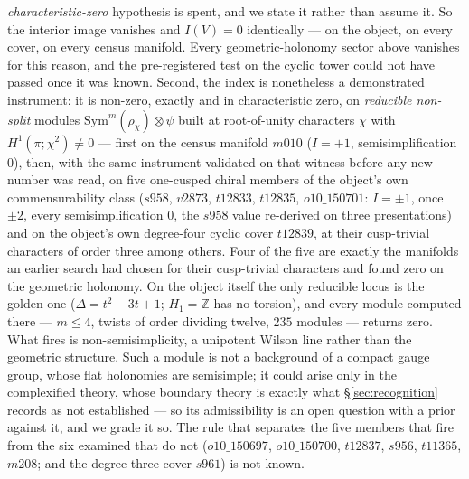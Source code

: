 \documentclass[11pt,a4paper]{article}
\theoremstyle{definition}
\theoremstyle{remark}
\newcommand{\Z}{\mathbb{Z}}
\begin{document}
\emph{characteristic-zero} hypothesis is spent, and we state it rather than assume it. So the interior image vanishes and $I(V) = 0$ identically --- on the object, on every cover, on every census manifold. Every geometric-holonomy sector above vanishes for this reason, and the pre-registered test on the cyclic tower could not have passed once it was known. Second, the index is nonetheless a demonstrated instrument: it is non-zero, exactly and in characteristic zero, on \emph{reducible non-split} modules $\mathrm{Sym}^m(\rho_\chi) \otimes \psi$ built at root-of-unity characters $\chi$ with $H^1(\pi;\chi^2) \neq 0$ --- first on the census manifold $m010$ ($I = +1$, semisimplification $0$), then, with the same instrument validated on that witness before any new number was read, on five one-cusped chiral members of the object's own commensurability class ($s958$, $v2873$, $t12833$, $t12835$, $o10\_150701$: $I = \pm 1$, once $\pm 2$, every semisimplification $0$, the $s958$ value re-derived on three presentations) and on the object's own degree-four cyclic cover $t12839$, at their cusp-trivial characters of order three among others. Four of the five are exactly the manifolds an earlier search had chosen for their cusp-trivial characters and found zero on the geometric holonomy. On the object itself the only reducible locus is the golden one ($\Delta = t^2 - 3t + 1$; $H_1 = \Z$ has no torsion), and every module computed there --- $m \le 4$, twists of order dividing twelve, $235$ modules --- returns zero. What fires is non-semisimplicity, a unipotent Wilson line rather than the geometric structure. Such a module is not a background of a compact gauge group, whose flat holonomies are semisimple; it could arise only in the complexified theory, whose boundary theory is exactly what \S\ref{sec:recognition} records as not established --- so its admissibility is an open question with a prior against it, and we grade it so. The rule that separates the five members that fire from the six examined that do not ($o10\_150697$, $o10\_150700$, $t12837$, $s956$, $t11365$, $m208$; and the degree-three cover $s961$) is not known.
\end{document}
